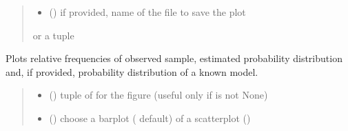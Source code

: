 \documentclass[letterpaper,10pt,english]{sphinxmanual}
\begin{document}
\begin{fulllineitems}
\begin{fulllineitems}
\begin{quote}
\begin{description}
\begin{itemize}
\item {} 
\sphinxAtStartPar
{} () \textendash{} if provided, name of the file to save the plot

\end{itemize}

\sphinxAtStartPar
{} or a tuple 

\end{description}\end{quote}

\end{fulllineitems}


\begin{fulllineitems}
\label{\detokenize{cubmods:cubmods.cub.CUBresCUB00.plot_ordinal}}
\pysigstartsignatures
{}
\pysigstopsignatures
\sphinxAtStartPar
Plots relative frequencies of observed sample, estimated probability distribution and,
if provided, probability distribution of a known model.
\begin{quote}\begin{description}
\begin{itemize}
\item {} 
\sphinxAtStartPar
{} () \textendash{} tuple of  for the figure (useful only if  is not None)

\item {} 
\sphinxAtStartPar
{} () \textendash{} choose a barplot ( default) of a scatterplot ()


\end{itemize}
\end{description}
\end{quote}
\end{fulllineitems}
\end{fulllineitems}
\end{document}
